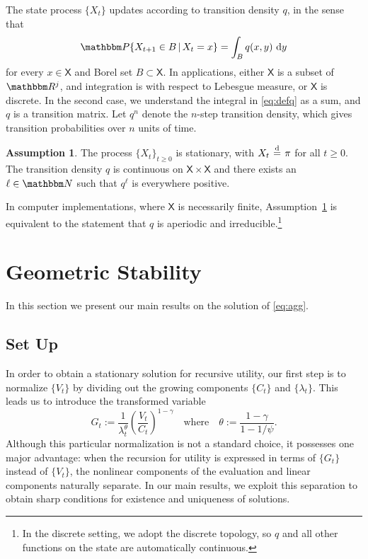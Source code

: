 \documentclass[12pt, reqno]{amsart}
\renewcommand{\geq}{\geqslant}
\newcommand{\eqdist}{\stackrel {\textrm{ \scriptsize{d} }} {=} }
\newcommand{\1}{\mathbbm 1}
\newcommand{\given}{\, | \,}
\newcommand*\diff{\mathop{}\!\mathrm{d}}
\newcommand{\RR}{\mathbbm R}
\newcommand{\NN}{\mathbbm N}
\newcommand{\PP}{\mathbbm P}
\newcommand{\XX}{\mathsf X}
\theoremstyle{plain}
\theoremstyle{definition}
\newtheorem{assumption}{Assumption}[section]
\begin{document}
The state process $\{ X_t\}$ updates according to transition density $q$, in
the sense that
%
\begin{equation}\label{eq:defq}
    \PP\{X_{t+1} \in B \given X_t = x\}
    = \int_B q(x, y) \, \diff y
\end{equation}
%
for every $x \in \XX$ and Borel set $B \subset \XX$.
In applications, either $\XX$ is a subset of $\RR^j$, and integration is with
respect to Lebesgue measure, or $\XX$ is discrete. In the second case, we
understand the integral in \eqref{eq:defq} as a sum, and $q$ is a transition
matrix. Let $q^n$ denote the $n$-step transition density, which gives transition
probabilities over $n$ units of time.
%
\begin{assumption}\label{a:q}
    The process $\{ X_t \}_{t \geq 0}$ is stationary, with $X_t \eqdist \pi$ for
    all $t \geq 0$.  The transition density $q$ is continuous on $\XX \times
    \XX$ and there exists an $\ell \in \NN$ such that $q^\ell$ is everywhere
    positive.
\end{assumption}
%
In computer implementations, where $\XX$ is necessarily finite,
Assumption~\ref{a:q} is equivalent to the statement that $q$ is aperiodic and
irreducible.\footnote{In the discrete setting, we adopt the discrete topology,
so $q$ and all other functions on the state are automatically continuous.}


\section{Geometric Stability}\label{s:results}

In this section we present our main results on the solution of \eqref{eq:agg}.

\subsection{Set Up}

In order to obtain a stationary solution for recursive utility, our first step
is to normalize $\{V_t\}$ by dividing out the growing components $\{C_t\}$ and
$\{\lambda_t\}$.  This leads us to introduce the transformed variable
%
\begin{equation}\label{eq:gdef}
    G_t := \frac{1}{\lambda_t^\theta} \left( \frac{V_t}{C_t} \right)^{1-\gamma}
    \quad \text{where} \quad
    \theta := \frac{1-\gamma}{1-1/\psi} .
\end{equation}
%
Although this particular normalization is not a standard choice, it
possesses one major advantage: when the recursion for utility is expressed in
terms of $\{G_t\}$ instead of $\{V_t\}$, the 
nonlinear components of the evaluation and linear components naturally
separate.  In our main results,  we exploit this
separation to obtain sharp conditions for existence and uniqueness of
solutions.
\end{document}

